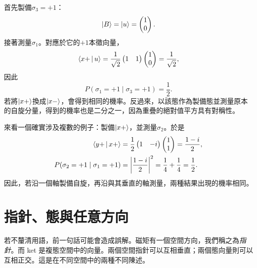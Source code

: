 首先製備\(\sigma_3=+1\)：
\begin{equation}
  \left\lvert B\right\rangle=\left\lvert u\right\rangle=\begin{pmatrix}1\\0\end{pmatrix}.
\end{equation}
接著測量\(\sigma_1\)。對應於它的\(+1\)本徵向量，
\begin{equation}
  \left\langle x+\,\middle|\,u\right\rangle
  =
  \frac{1}{\sqrt2}
  \begin{pmatrix}1&1\end{pmatrix}
  \begin{pmatrix}1\\0\end{pmatrix}
  =\frac{1}{\sqrt2},
\end{equation}
因此
\begin{equation}
  P(\sigma_1=+1\mid\sigma_3=+1)=\frac12.
\end{equation}
若將\(\left\lvert x+\right\rangle\)換成\(\left\lvert x-\right\rangle\)，會得到相同的機率。反過來，以該態作為製備態並測量原本的自旋分量，得到的機率也是二分之一，因為重疊的絕對值平方具有對稱性。

來看一個確實涉及複數的例子：製備\(\left\lvert x+\right\rangle\)，並測量\(\sigma_2\)。於是
\begin{align}
  \left\langle y+\,\middle|\,x+\right\rangle
  &=
  \frac12
  \begin{pmatrix}1&-i\end{pmatrix}
  \begin{pmatrix}1\\1\end{pmatrix}
  =\frac{1-i}{2},
  \notag\\
  P(\sigma_2=+1\mid\sigma_1=+1)
  &=\left|\frac{1-i}{2}\right|^2
  =\frac14+\frac14
  =\frac12.
  \label{eq:l03-complex-probability-example}
\end{align}
因此，若沿一個軸製備自旋，再沿與其垂直的軸測量，兩種結果出現的機率相同。

\section{指針、態與任意方向}

若不釐清用語，前一句話可能會造成誤解。磁矩有一個空間方向，我們稱之為\emph{指針}。而 ket 是複態空間中的向量。兩個空間指針可以互相垂直；兩個態向量則可以互相正交。這是在不同空間中的兩種不同陳述。

\begin{classroomqa}
\end{classroomqa}

